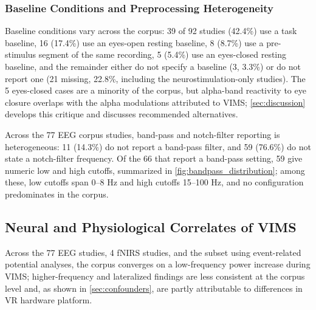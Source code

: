 \subsubsection{Baseline Conditions and Preprocessing Heterogeneity}
Baseline conditions vary across the corpus: 39 of 92 studies (42.4\%) use a task baseline, 16 (17.4\%) use an eyes-open resting baseline, 8 (8.7\%) use a pre-stimulus segment of the same recording, 5 (5.4\%) use an eyes-closed resting baseline, and the remainder either do not specify a baseline (3, 3.3\%) or do not report one (21 missing, 22.8\%, including the neurostimulation-only studies).
The 5 eyes-closed cases are a minority of the corpus, but alpha-band reactivity to eye closure overlaps with the alpha modulations attributed to VIMS; \autoref{sec:discussion} develops this critique and discusses recommended alternatives.

Across the 77 EEG corpus studies, band-pass and notch-filter reporting is heterogeneous: 11 (14.3\%) do not report a band-pass filter, and 59 (76.6\%) do not state a notch-filter frequency.
Of the 66 that report a band-pass setting, 59 give numeric low and high cutoffs, summarized in \autoref{fig:bandpass_distribution}; among these, low cutoffs span 0--8 Hz and high cutoffs 15--100 Hz, and no configuration predominates in the corpus.





\subsection{Neural and Physiological Correlates of VIMS}\label{sec:correlates}

Across the 77 EEG studies, 4 fNIRS studies, and the subset using event-related potential analyses, the corpus converges on a low-frequency power increase during VIMS; higher-frequency and lateralized findings are less consistent at the corpus level and, as shown in \autoref{sec:confounders}, are partly attributable to differences in VR hardware platform.

